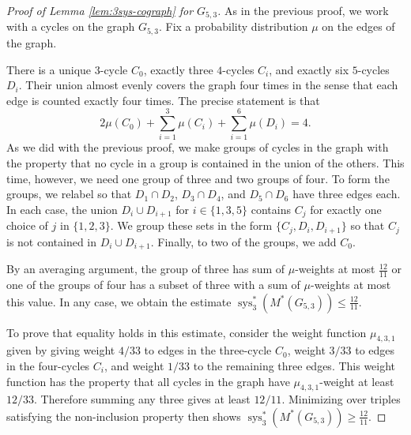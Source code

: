 \documentclass[reqno,12pt]{amsart}
\numberwithin{theorem}{section}
\theoremstyle{plain}
\theoremstyle{definition}
\theoremstyle{remark}
\numberwithin{equation}{section}
\numberwithin{table}{section}
\DeclareMathOperator{\sys}{sys}
\begin{document}
\begin{proof}[Proof of Lemma \ref{lem:3sys-cograph} for $G_{5,3}$]
As in the previous proof, we work with a cycles on the graph $G_{5,3}$. Fix a probability distribution $\mu$ on the edges of the graph. 

There is a unique $3$-cycle $C_0$, exactly three $4$-cycles $C_i$, and exactly six $5$-cycles $D_i$. Their union almost evenly covers the graph four times in the sense that each edge is counted exactly four times. The precise statement is that
    \[2\mu(C_0) + \sum_{i=1}^3 \mu(C_i) + \sum_{i=1}^6 \mu(D_i) = 4.\]
As we did with the previous proof, we make groups of cycles in the graph with the property that no cycle in a group is contained in the union of the others. This time, however, we need one group of three and two groups of four. To form the groups, we relabel so that $D_1 \cap D_2$, $D_3 \cap D_4$, and $D_5 \cap D_6$ have three edges each. In each case, the union $D_i \cup D_{i+1}$ for $i \in \{1,3,5\}$ contains $C_j$ for exactly one choice of $j$ in $\{1,2,3\}$. We group these sets in the form $\{C_j,D_i,D_{i+1}\}$ so that $C_j$ is not contained in $D_i \cup D_{i+1}$. Finally, to two of the groups, we add $C_0$.

By an averaging argument, the group of three has sum of $\mu$-weights at most $\tfrac{12}{11}$ or one of the groups of four has a subset of three with a sum of $\mu$-weights at most this value. In any case, we obtain the estimate $\sys_3^*(M^*(G_{5,3})) \leq \tfrac{12}{11}$. 

To prove that equality holds in this estimate, consider the weight function $\mu_{4,3,1}$ given by giving weight $4/33$ to edges in the three-cycle $C_0$, weight $3/33$ to edges in the four-cycles $C_i$, and weight $1/33$ to the remaining three edges. This weight function has the property that all cycles in the graph have $\mu_{4,3,1}$-weight at least $12/33$. Therefore summing any three gives at least $12/11$. Minimizing over triples satisfying the non-inclusion property then shows $\sys_3^*(M^*(G_{5,3})) \geq \tfrac{12}{11}$. 
\end{proof}
\end{document}
